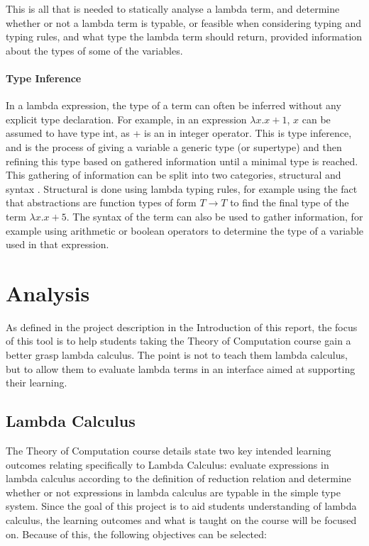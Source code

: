 \documentclass[a4paper,11pt]{report}
\begin{document}
This is all that is needed to statically analyse a lambda term, and determine whether or not a lambda term is typable, or feasible when considering typing and typing rules, and what type the lambda term should return, provided information about the types of some of the variables.

\subsubsection{Type Inference}
In a lambda expression, the type of a term can often be inferred without any explicit type declaration. For example, in an expression $\lambda x.x+1$, $x$ can be assumed to have type int, as + is an in integer operator. This is type inference, and is the process of giving a variable a generic type (or supertype) and then refining this type based on gathered information until a minimal type is reached. \cite{Gay2019} \cite{Bezem2008} \cite{Wiesner2011}\\

This gathering of information can be split into two categories, structural and syntax \cite{Bezem2008}. Structural is done using lambda typing rules, for example using the fact that abstractions are function types of form $T \rightarrow T$ to find the final type of the term $\lambda x.x+5$. The syntax of the term can also be used to gather information, for example using arithmetic or boolean operators to determine the type of a variable used in that expression.

\renewcommand{\cleardoublepage}{}
\renewcommand{\clearpage}{}
\chapter{Analysis}
As defined in the project description in the Introduction of this report, the focus of this tool is to help students taking the Theory of Computation course gain a better grasp lambda calculus. The point is not to teach them lambda calculus, but to allow them to evaluate lambda terms in an interface aimed at supporting their learning.

\section{Lambda Calculus}
The Theory of Computation course details \cite{CourseSpecification} state two key intended learning outcomes relating specifically to Lambda Calculus: evaluate expressions in lambda calculus according to the definition of reduction relation and determine whether or not expressions in lambda calculus are typable in the simple type system. Since the goal of this project is to aid students understanding of lambda calculus, the learning outcomes and what is taught on the course will be focused on. Because of this, the following objectives can be selected:
\end{document}
